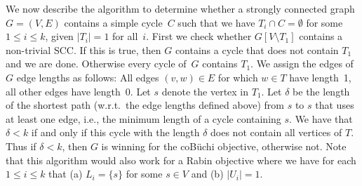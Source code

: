 \documentclass[11pt,letterpaper]{article}
\newcommand{\set}[1]{\{#1\}}
\newcommand{\lu}{\textup{(}}
\newcommand{\ru}{\textup{)}\xspace}
\newcommand{\upbr}[1]{\lu #1\ru}
\newcommand{\target}{T\xspace}
\begin{document}
We now describe the algorithm to determine whether a strongly connected
graph $G = (V, E)$ contains a simple cycle~$C$ such that we have 
$\target_i \cap C = \emptyset$ for some $1 \le i \le k$, given $\lvert \target_i 
\rvert = 1$ for all~$i$.
First we check whether $G[V \setminus \target_1]$ contains a non-trivial SCC. 
If this is true, then
$G$ contains a cycle that does not contain $\target_1$ and we are done. Otherwise
every cycle of~$G$ contains $\target_1$. We assign the edges of~$G$ edge lengths
as follows: All edges $(v, w) \in E$ for which $w \in \target$ have length~1,
all other edges have length~0. 
Let $s$ denote the vertex in $\target_1$. 
Let $\delta$ be the length of the shortest path (w.r.t.\ the edge lengths 
defined above) from $s$ to $s$ that uses at least one edge, i.e., the minimum 
length of a cycle containing $s$. We have that $\delta < k$ if and only if 
this cycle with the length $\delta$ does not contain all vertices of $\target$.
Thus if $\delta < k$, then $G$ is winning for the coBüchi objective, otherwise not.
Note that this algorithm would also work for a Rabin objective where we have
for each $1 \le i \le k$ that \upbr{a} $L_i = \set{s}$ for some $s \in V$ and 
\upbr{b} $\lvert U_i \rvert = 1$.
\end{document}
